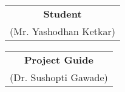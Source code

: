 \vspace{4cm}

{\centering
  \begin{tabular}{c}
    \hline
    \textbf{Student}       \\
    (Mr. Yashodhan Ketkar) \\
  \end{tabular}
  \hfill
  \begin{tabular}{c}
    \hline
    \textbf{Project Guide} \\
    (Dr. Sushopti Gawade)  \\
  \end{tabular}
}
